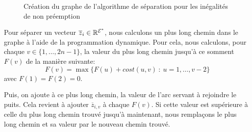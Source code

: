 \begin{ex}
\begin{figure}[!htb]
  \caption{Création du graphe de l'algorithme de séparation pour les
      inégalités de non préemption}
    \label{fig:algo_sep}
  \end{figure}
\end{ex}

Pour séparer un vecteur $\overline{z}_i \in \mathbb{R}^{{\cal E}^*}$, nous
calculons un plus long chemin dans le graphe à l'aide de la
programmation dynamique. Pour cela, nous calculons, pour chaque $v \in
\{1,\dots,2n-1\}$, la valeur  du plus long chemin jusqu'à ce somment
$F(v)$ de la manière suivante:
\begin{equation}
  F(v) = \max\{ F(u) + cost (u,v) \ : \ u=1,\dots,v-2 \}
\end{equation}
avec $F(1)=F(2)=0$. 

Puis, on ajoute à ce plus long chemin, la valeur de l'arc servant à
rejoindre le puits. Cela revient à ajouter $\overline{z}_{i,v}$ à
chaque $F(v)$. Si cette valeur est supérieure à celle du
plus long chemin trouvé jusqu'à maintenant, nous remplaçons le plus
long chemin et sa valeur par le nouveau chemin trouvé.

